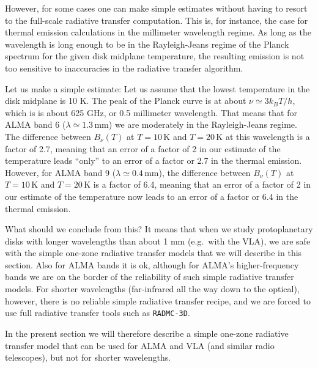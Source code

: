 \documentclass{book}
\newcommand{\code}[1]{{\small\tt #1}}
\begin{document}
However, for some cases one can make simple estimates without having to resort
to the full-scale radiative transfer computation. This is, for instance, the
case for thermal emission calculations in the millimeter wavelength regime. As
long as the wavelength is long enough to be in the Rayleigh-Jeans regime of the
Planck spectrum for the given disk midplane temperature, the resulting emission
is not too sensitive to inaccuracies in the radiative transfer algorithm.

Let us make a simple estimate: Let us assume that the lowest temperature in the
disk midplane is 10 K. The peak of the Planck curve is at about $\nu\simeq
3k_BT/h$, which is is about 625 GHz, or 0.5 millimeter wavelength. That means
that for ALMA band 6 ($\lambda\simeq 1.3\,\mathrm{mm}$) we are moderately in the
Rayleigh-Jeans regime.  The difference between $B_\nu(T)$ at $T=10\,\mathrm{K}$
and $T=20\,\mathrm{K}$ at this wavelength is a factor of 2.7, meaning that an
error of a factor of 2 in our estimate of the temperature leads ``only'' to an
error of a factor or 2.7 in the thermal emission. However, for ALMA band 9
($\lambda\simeq 0.4\,\mathrm{mm}$), the difference between $B_\nu(T)$ at
$T=10\,\mathrm{K}$ and $T=20\,\mathrm{K}$ is a factor of 6.4, meaning that an
error of a factor of 2 in our estimate of the temperature now leads to an
error of a factor or 6.4 in the thermal emission.

What should we conclude from this? It means that when we study protoplanetary
disks with longer wavelengths than about 1 mm (e.g.\ with the VLA), we are safe
with the simple one-zone radiative transfer models that we will describe in this
section. Also for ALMA bands it is ok, although for ALMA's higher-frequency
bands we are on the border of the reliability of such simple radiative transfer
models. For shorter wavelengths (far-infrared all the way down to the optical),
however, there is no reliable simple radiative transfer recipe, and we are
forced to use full radiative transfer tools such as \code{RADMC-3D}.

In the present section we will therefore describe a simple one-zone radiative
transfer model that can be used for ALMA and VLA (and similar radio telescopes),
but not for shorter wavelengths.
\end{document}
